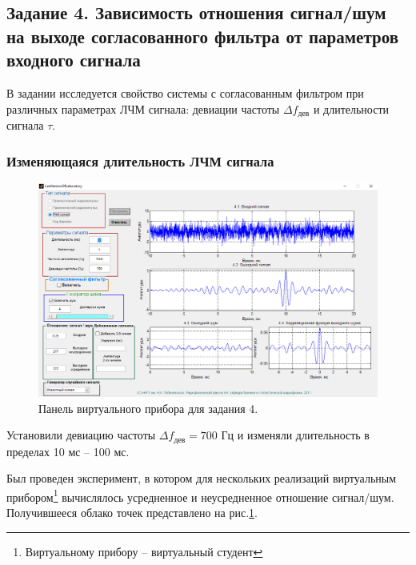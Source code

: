 
\newcommand{\df}{\Delta f_{\text{дев}}}
\subsection{Задание 4. Зависимость отношения сигнал/шум на выходе согласованного
фильтра от параметров входного сигнала}

В задании исследуется свойство системы с согласованным фильтром при различных
параметрах ЛЧМ сигнала: девиации частоты $\Delta f_{\text{дев}}$ и длительности
сигнала $\tau$.




\subsubsection{Изменяющаяся длительность ЛЧМ сигнала}%
\label{ssub:izmeniaiushchaiasia_dlitel_nost_signala_tau_}

\begin{figure}[h!]
    \centering
    \includegraphics[width=\linewidth]{python/task4/t4s4_10_0}
    \caption{Панель виртуального прибора для задания 4.}
    \label{fig:4.1}
\end{figure}

Установили девиацию частоты $\Delta f_{\text{дев}}= 700$ Гц и изменяли
длительность в пределах 10 мс -- 100 мс. 


Был проведен эксперимент, в котором для нескольких реализаций виртуальным
прибором\footnote{Виртуальному прибору -- виртуальный студент}
вычислялось усредненное и неусредненное отношение сигнал/шум. Получившееся
облако точек представлено на рис.\ref{fig:4.1}.



